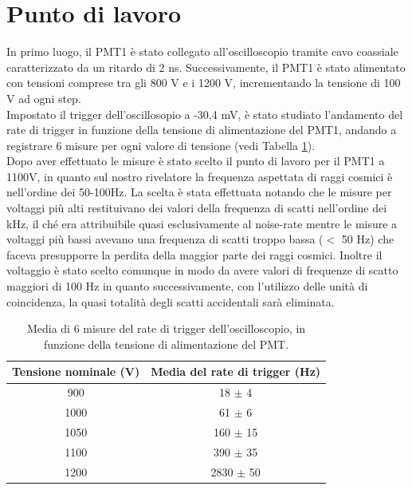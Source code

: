\documentclass[10pt,a4paper]{article}
\begin{document}
\section{Punto di lavoro}
In primo luogo, il PMT1 è stato collegato all'oscilloscopio tramite cavo coassiale caratterizzato da un ritardo di 2 ns.
Successivamente, il PMT1 è stato alimentato con tensioni comprese tra gli 800 V e i 1200 V, incrementando la tensione di 100 V ad ogni step. \\
Impostato il trigger dell'oscillosopio a -30,4 mV, è stato studiato l'andamento del rate di trigger in funzione della tensione di alimentazione del PMT1, andando a registrare 6 misure per ogni valore di tensione (vedi Tabella \ref{tab:rate_vs_v}).\\
Dopo aver effettuato le misure è stato scelto il punto di lavoro per il PMT1 a 1100V, in quanto sul nostro rivelatore la frequenza aspettata di raggi cosmici è nell'ordine dei 50-100Hz. \singlespacing
La scelta è stata effettuata notando che le misure per voltaggi più alti restituivano dei valori della frequenza di scatti nell'ordine dei kHz, il ché era attribuibile quasi esclusivamente al noise-rate mentre le misure a voltaggi più bassi avevano una frequenza di scatti troppo bassa ($<$ 50 Hz) che faceva presupporre la perdita della maggior parte dei raggi cosmici.
Inoltre il voltaggio è stato scelto comunque in modo da avere valori di frequenze di scatto maggiori di 100 Hz in quanto successivamente, con l'utilizzo delle unità di coincidenza, la quasi totalità degli scatti accidentali sarà eliminata.

\begin{table}[htbp]
    \centering
   
    \begin{tabular}{||c|c||}
        
       
    
     
        \hline   
        \textbf{Tensione nominale (V)} & \textbf{Media del rate di trigger (Hz)} \\
        \hline 
        900  & 18 ${\pm}$ 4 \\
        \hline
        1000 & 61 ${\pm}$ 6 \\
        \hline
        1050 & 160 ${\pm}$ 15 \\
        \hline
        1100 & 390 ${\pm}$ 35 \\
        \hline
        1200 & 2830 ${\pm}$ 50 \\
        \hline
    \end{tabular}
    \caption{Media di 6 misure del rate di trigger dell'oscilloscopio,
     in funzione della tensione di alimentazione del PMT.}
     \label{tab:rate_vs_v}
\end{table}
\end{document}
